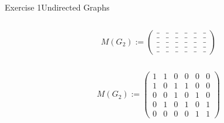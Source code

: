 \begin{frame}[allowframebreaks]{Exercise 1}{Undirected Graphs}
  \begin{solutionnoinc}
    \begin{columns}
      \begin{column}{0.5\textwidth} 
      \end{column}
      \begin{column}{0.5\textwidth} 
        $M(G_2) :=
        \begin{pmatrix}
          \_ & \_ & \_ & \_ & \_ & \_ \\
          \_ & \_ & \_ & \_ & \_ & \_ \\
          \_ & \_ & \_ & \_ & \_ & \_ \\
          \_ & \_ & \_ & \_ & \_ & \_ \\
          \_ & \_ & \_ & \_ & \_ & \_
        \end{pmatrix}$
      \end{column}
    \end{columns}
  \end{solutionnoinc}
  \begin{solution}
    \begin{columns}
      \begin{column}{0.5\textwidth} 
      \end{column}
      \begin{column}{0.5\textwidth} 
        $M(G_2) :=
        \begin{pmatrix}
          1 & 1 & 0 & 0 & 0 & 0 \\
          1 & 0 & 1 & 1 & 0 & 0 \\
          0 & 0 & 1 & 0 & 1 & 0 \\
          0 & 1 & 0 & 1 & 0 & 1 \\
          0 & 0 & 0 & 0 & 1 & 1
        \end{pmatrix}$
      \end{column}
    \end{columns}
  \end{solution}
\end{frame} 
